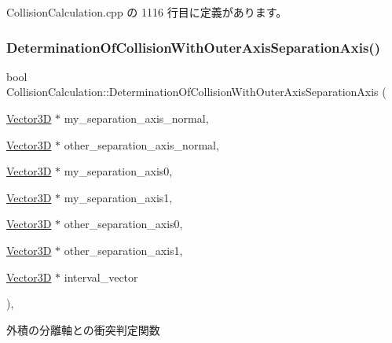  Collision\+Calculation.\+cpp の 1116 行目に定義があります。

\mbox{\label{class_collision_calculation_a7ad238e8d35646bf4034879204d94533}} 
\subsubsection{\texorpdfstring{Determination\+Of\+Collision\+With\+Outer\+Axis\+Separation\+Axis()}{DeterminationOfCollisionWithOuterAxisSeparationAxis()}}
{\footnotesize\ttfamily bool Collision\+Calculation\+::\+Determination\+Of\+Collision\+With\+Outer\+Axis\+Separation\+Axis (\begin{DoxyParamCaption}\item[{\mbox{\hyperlink{class_vector3_d}{Vector3D}} $\ast$}]{my\+\_\+separation\+\_\+axis\+\_\+normal,  }\item[{\mbox{\hyperlink{class_vector3_d}{Vector3D}} $\ast$}]{other\+\_\+separation\+\_\+axis\+\_\+normal,  }\item[{\mbox{\hyperlink{class_vector3_d}{Vector3D}} $\ast$}]{my\+\_\+separation\+\_\+axis0,  }\item[{\mbox{\hyperlink{class_vector3_d}{Vector3D}} $\ast$}]{my\+\_\+separation\+\_\+axis1,  }\item[{\mbox{\hyperlink{class_vector3_d}{Vector3D}} $\ast$}]{other\+\_\+separation\+\_\+axis0,  }\item[{\mbox{\hyperlink{class_vector3_d}{Vector3D}} $\ast$}]{other\+\_\+separation\+\_\+axis1,  }\item[{\mbox{\hyperlink{class_vector3_d}{Vector3D}} $\ast$}]{interval\+\_\+vector }\end{DoxyParamCaption})\hspace{0.3cm}{\ttfamily [static]}, {\ttfamily [private]}}



外積の分離軸との衝突判定関数 


